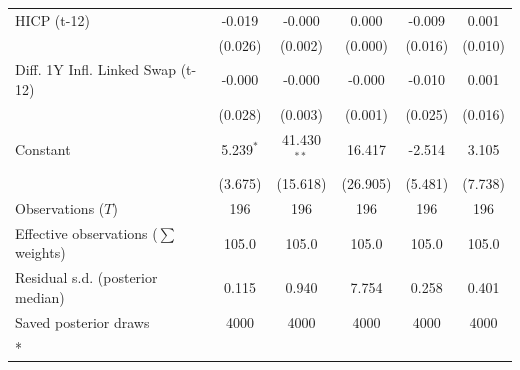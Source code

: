 \begin{longtable}[t]{lccccc}
HICP (t-12) & -0.019 & -0.000 & 0.000 & -0.009 & 0.001\\
 & (0.026) & (0.002) & (0.000) & (0.016) & (0.010)\\
Diff. 1Y Infl. Linked Swap (t-12) & -0.000 & -0.000 & -0.000 & -0.010 & 0.001\\
 & (0.028) & (0.003) & (0.001) & (0.025) & (0.016)\\
Constant & 5.239$^{*}$ & 41.430$^{**}$ & 16.417 & -2.514 & 3.105\\
 & (3.675) & (15.618) & (26.905) & (5.481) & (7.738)\\
\midrule
Observations ($T$) & 196 & 196 & 196 & 196 & 196\\
Effective observations ($\sum$ weights) & 105.0 & 105.0 & 105.0 & 105.0 & 105.0\\
Residual s.d. (posterior median) & 0.115 & 0.940 & 7.754 & 0.258 & 0.401\\
Saved posterior draws & 4000 & 4000 & 4000 & 4000 & 4000\\*
\end{longtable}
\endgroup{}

